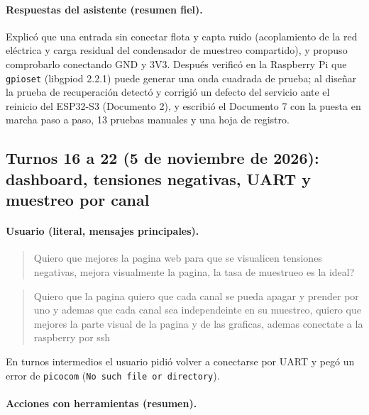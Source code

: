 \documentclass[12pt,a4paper]{article}
\begin{document}
\paragraph{Respuestas del asistente (resumen fiel).} Explicó que una entrada sin conectar flota y capta ruido (acoplamiento de la red eléctrica y carga residual del condensador de muestreo compartido), y propuso comprobarlo conectando GND y 3V3. Después verificó en la Raspberry Pi que \texttt{gpioset} (libgpiod 2.2.1) puede generar una onda cuadrada de prueba; al diseñar la prueba de recuperación detectó y corrigió un defecto del servicio ante el reinicio del ESP32-S3 (Documento 2), y escribió el Documento 7 con la puesta en marcha paso a paso, 13 pruebas manuales y una hoja de registro.

\subsection{Turnos 16 a 22 (5 de noviembre de 2026): dashboard, tensiones negativas, UART y muestreo por canal}

\paragraph{Usuario (literal, mensajes principales).}
\begin{quote}
Quiero que mejores la pagina web para que se visualicen tensiones negativas, mejora visualmente la pagina, la tasa de muestrueo es la ideal?
\end{quote}
\begin{quote}
Quiero que la pagina quiero que cada canal se pueda apagar y prender por uno y ademas que cada canal sea independeinte en su muestreo, quiero que mejores la parte visual de la pagina y de las graficas, ademas conectate a la raspberry por ssh
\end{quote}
En turnos intermedios el usuario pidió volver a conectarse por UART y pegó un error de \texttt{picocom} (\texttt{No such file or directory}).

\paragraph{Acciones con herramientas (resumen).}
\end{document}
